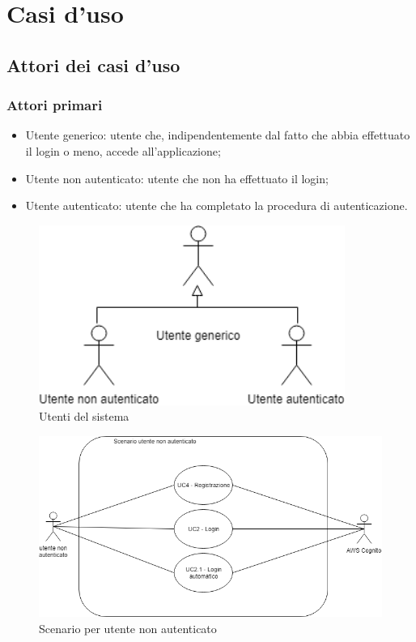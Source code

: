 \clearpage
\section{Casi d'uso}
\label{sec:user_case}
\subsection{Attori dei casi d'uso}
\label{sec:attori_uc}
\subsubsection{Attori primari}
\begin{itemize}
	\item  Utente generico: utente che, indipendentemente dal fatto che abbia effettuato il login o meno, accede all'applicazione;
	\item  Utente non autenticato: utente che non ha effettuato il login;
	\item  Utente autenticato: utente che ha completato la procedura di autenticazione.
\end{itemize}

\begin{figure}[H]
	\centering
	\includegraphics[width=10cm,keepaspectratio]{../includes/pics/primari.png}
	\caption{\label{fig:mission}Utenti del sistema}
\end{figure}

\begin{figure}[H]
	\centering
	\includegraphics[width=15cm,keepaspectratio]{../includes/pics/scenario_non_autenticato.png}
	\caption{\label{fig:mission}Scenario per utente non autenticato}
\end{figure}

